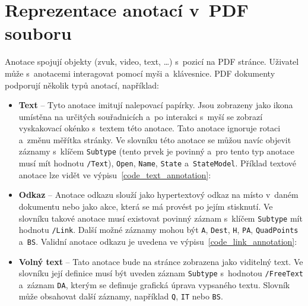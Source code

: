 \section{Reprezentace anotací v~PDF souboru}
Anotace spojují objekty (zvuk, video, text, \dots) s~pozicí na PDF stránce.
Uživatel může s~anotacemi interagovat pomocí myši a~klávesnice.
 PDF dokumenty podporují několik typů anotací, 
například:
\begin{itemize}
    \item \textbf{Text} -- Tyto anotace imitují nalepovací papírky. Jsou
    zobrazeny jako ikona umístěna na určitých souřadnicích a~po interakci s~myší
    se zobrazí vyskakovací okénko s~textem této anotace. Tato anotace ignoruje
    rotaci a~změnu měřítka stránky. Ve slovníku této anotace se můžou navíc
    objevit záznamy s~klíčem \texttt{Subtype} (tento prvek je povinný a~pro tento
    typ anotace musí mít hodnotu \texttt{/Text}), \texttt{Open}, \texttt{Name},
    \texttt{State} a~\texttt{StateModel}. Příklad textové anotace lze vidět ve
    výpisu~\ref{code_text_annotation}:

    \item \textbf{Odkaz} -- Anotace odkazu slouží jako hypertextový
    odkaz na místo v~daném dokumentu nebo jako akce, která se má
    provést po jejím stisknutí. Ve slovníku takové anotace musí
    existovat povinný záznam s~klíčem \texttt{Subtype} mít hodnotu
    \texttt{/Link}. Další možné záznamy mohou být \texttt{A},
    \texttt{Dest}, \texttt{H}, \texttt{PA}, \texttt{QuadPoints}
    a~\texttt{BS}. Validní anotace odkazu je uvedena ve
    výpisu~\ref{code_link_annotation}:
    
    \item \textbf{Volný text} -- Tato anotace bude na stránce
    zobrazena jako viditelný text. Ve slovníku její definice
    musí být uveden záznam \texttt{Subtype} s~hodnotou
    \texttt{/FreeText} a~záznam \texttt{DA}, kterým se definuje
    grafická úprava vypsaného textu. Slovník může obsahovat další
    záznamy, například \texttt{Q}, \texttt{IT} nebo \texttt{BS}.
    

\end{itemize}
